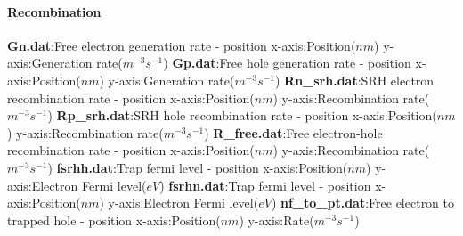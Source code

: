 \paragraph{Recombination}
\textbf{Gn.dat}:Free electron generation rate - position\newline
x-axis:Position($nm$)\newline
y-axis:Generation rate($m^{-3} s^{-1}$)\newline
\newline
\textbf{Gp.dat}:Free hole generation rate - position\newline
x-axis:Position($nm$)\newline
y-axis:Generation rate($m^{-3} s^{-1}$)\newline
\newline
\textbf{Rn\_srh.dat}:SRH electron recombination rate - position\newline
x-axis:Position($nm$)\newline
y-axis:Recombination rate($m^{-3} s^{-1}$)\newline
\newline
\textbf{Rp\_srh.dat}:SRH hole recombination rate - position\newline
x-axis:Position($nm$)\newline
y-axis:Recombination rate($m^{-3} s^{-1}$)\newline
\newline
\textbf{R\_free.dat}:Free electron-hole recombination rate - position\newline
x-axis:Position($nm$)\newline
y-axis:Recombination rate($m^{-3} s^{-1}$)\newline
\newline
\textbf{fsrhh.dat}:Trap fermi level - position\newline
x-axis:Position($nm$)\newline
y-axis:Electron Fermi level($eV$)\newline
\newline
\textbf{fsrhn.dat}:Trap fermi level - position\newline
x-axis:Position($nm$)\newline
y-axis:Electron Fermi level($eV$)\newline
\newline
\textbf{nf\_to\_pt.dat}:Free electron to trapped hole - position\newline
x-axis:Position($nm$)\newline
y-axis:Rate($m^{-3} s^{-1}$)\newline

